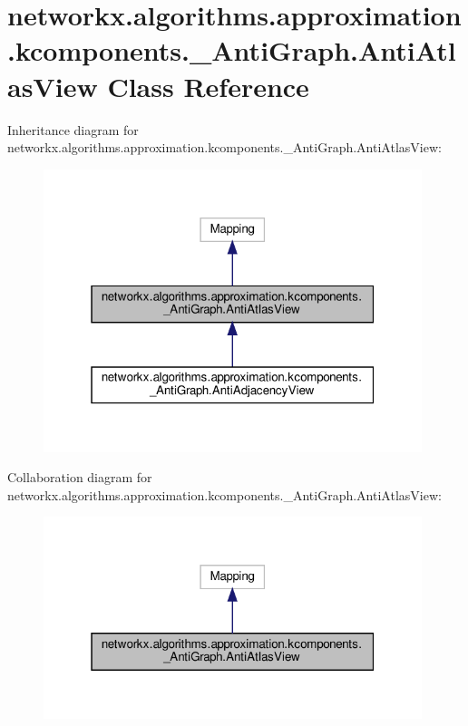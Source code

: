 \hypertarget{classnetworkx_1_1algorithms_1_1approximation_1_1kcomponents_1_1__AntiGraph_1_1AntiAtlasView}{}\section{networkx.\+algorithms.\+approximation.\+kcomponents.\+\_\+\+Anti\+Graph.\+Anti\+Atlas\+View Class Reference}
\label{classnetworkx_1_1algorithms_1_1approximation_1_1kcomponents_1_1__AntiGraph_1_1AntiAtlasView}


Inheritance diagram for networkx.\+algorithms.\+approximation.\+kcomponents.\+\_\+\+Anti\+Graph.\+Anti\+Atlas\+View\+:
\nopagebreak
\begin{figure}[H]
\begin{center}
\leavevmode
\includegraphics[width=313pt]{classnetworkx_1_1algorithms_1_1approximation_1_1kcomponents_1_1__AntiGraph_1_1AntiAtlasView__inherit__graph}
\end{center}
\end{figure}


Collaboration diagram for networkx.\+algorithms.\+approximation.\+kcomponents.\+\_\+\+Anti\+Graph.\+Anti\+Atlas\+View\+:
\nopagebreak
\begin{figure}[H]
\begin{center}
\leavevmode
\includegraphics[width=313pt]{classnetworkx_1_1algorithms_1_1approximation_1_1kcomponents_1_1__AntiGraph_1_1AntiAtlasView__coll__graph}
\end{center}
\end{figure}
